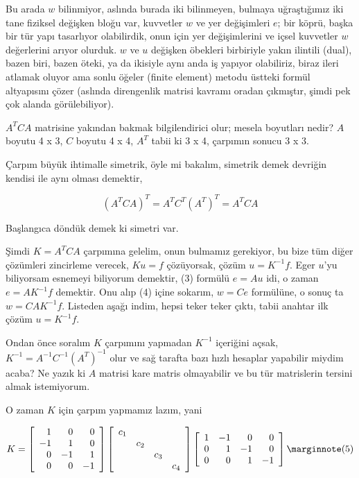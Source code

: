 \documentclass[12pt,fleqn]{article}\usepackage{../../common}
\begin{document}
Bu arada $w$ bilinmiyor, aslında burada iki bilinmeyen, bulmaya uğraştığımız iki
tane fiziksel değişken bloğu var, kuvvetler $w$ ve yer değişimleri $e$; bir
köprü, başka bir tür yapı tasarlıyor olabilirdik, onun için yer değişimlerini ve
içsel kuvvetler $w$ değerlerini arıyor olurduk. $w$ ve $u$ değişken öbekleri
birbiriyle yakın ilintili (dual), bazen biri, bazen öteki, ya da ikisiyle aynı
anda iş yapıyor olabiliriz, biraz ileri atlamak oluyor ama sonlu öğeler (finite
element) metodu üstteki formül altyapısını çözer (aslında direngenlik matrisi
kavramı oradan çıkmıştır, şimdi pek çok alanda görülebiliyor).

$A^T C A$ matrisine yakından bakmak bilgilendirici olur; mesela boyutları nedir?
$A$ boyutu 4 x 3, $C$ boyutu 4 x 4, $A^T$ tabii ki 3 x 4, çarpımın sonucu 3 x 3.

Çarpım büyük ihtimalle simetrik, öyle mi bakalım, simetrik demek devriğin
kendisi ile aynı olması demektir, 

$$
(A^T C A)^T = A^T C^T (A^T)^T = A^T C A 
$$

Başlangıca döndük demek ki simetri var.

Şimdi $K = A^T C A$ çarpımına gelelim, onun bulmamız gerekiyor, bu bize tüm
diğer çözümleri zincirleme verecek, $K u = f$ çözüyorsak, çözüm $u = K^{-1}f$.
Eger $u$'yu biliyorsam esnemeyi biliyorum demektir, (3) formülü $e = A u$
idi, o zaman $e = A K^{-1} f$ demektir. Onu alıp (4) içine sokarım, $w = C e$
formülüne, o sonuç ta $w = C A K^{-1} f$. Listeden aşağı indim, hepsi teker
teker çıktı, tabii anahtar ilk çözüm $u = K^{-1} f$.

Ondan önce soralım $K$ çarpımını yapmadan $K^{-1}$ içeriğini açsak,
$K^{-1} = A^{-1}C^{-1} (A^T)^{-1}$ olur ve sağ tarafta bazı hızlı hesaplar
yapabilir miydim acaba? Ne yazık ki $A$ matrisi kare matris olmayabilir ve
bu tür matrislerin tersini almak istemiyorum. 

O zaman $K$ için çarpım yapmamız lazım, yani

$$
K = \left[\begin{array}{rrrr}
1 & 0 & 0 \\ -1 & 1 & 0 \\ 0 & -1 & 1 \\ 0 & 0 & -1
\end{array}\right]
\left[\begin{array}{cccc}
c_1 & & & \\  & c_2 & & \\  & & c_3 & \\ & & & c_4
\end{array}\right]
\left[\begin{array}{rrrr}
1 & -1 & 0 & 0 \\ 0 & 1 & -1 & 0 \\ 0 & 0 & 1 & -1 
\end{array}\right]
\mlabel{5}
$$
\end{document}
